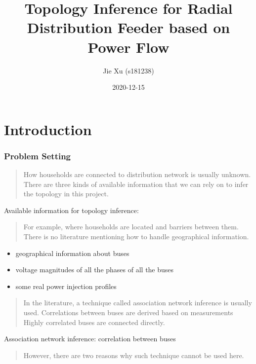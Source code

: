 \documentclass[
]{book}
\title{Topology Inference for Radial Distribution Feeder based on Power Flow}
\author{Jie Xu (s181238)}
\date{2020-12-15}
\providecommand{\tightlist}{%
  \setlength{\itemsep}{0pt}\setlength{\parskip}{0pt}}
\begin{document}
\maketitle

{
\setcounter{tocdepth}{1}
\tableofcontents
}
\hypertarget{introduction}{%
\chapter{Introduction}\label{introduction}}

\hypertarget{problem-setting}{%
\subsection*{Problem Setting}\label{problem-setting}}

\begin{quote}
How households are connected to distribution network is usually unknown.
There are three kinds of available information that we can rely on to infer
the topology in this project.
\end{quote}

Available information for topology inference:

\begin{quote}
For example, where households are located and barriers between them.
There is no literature mentioning how to handle geographical information.
\end{quote}

\begin{itemize}
\tightlist
\item
  geographical information about buses
\item
  voltage magnitudes of all the phases of all the buses
\item
  some real power injection profiles
\end{itemize}

\begin{quote}
In the literature, a technique called association network inference is
usually used. Correlations between buses are derived based on measurements
Highly correlated buses are connected directly.
\end{quote}

Association network inference: correlation between buses

\begin{quote}
However, there are two reasons why such technique cannot be used here.
\end{quote}
\end{document}
